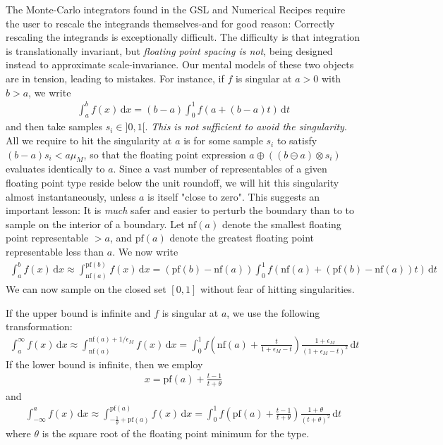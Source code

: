 \documentclass{ansarticle}
\begin{document}
The Monte-Carlo integrators found in the GSL and Numerical Recipes require the user to rescale the integrands themselves-and for good reason: Correctly rescaling the integrands is exceptionally difficult.
The difficulty is that integration is translationally invariant, but \emph{floating point spacing is not}, being designed instead to approximate scale-invariance.
Our mental models of these two objects are in tension, leading to mistakes.
For instance, if $f$ is singular at $a > 0$ with $b > a$, we write
\begin{align*}
\int_{a}^{b} f(x) \, \mathrm{d}x = (b-a) \int_{0}^{1} f(a + (b-a)t) \, \mathrm{d}t
\end{align*}
and then take samples $s_{i} \in ]0, 1[$.
\emph{This is not sufficient to avoid the singularity}.
All we require to hit the singularity at $a$ is for some sample $s_i$ to satisfy $(b-a)s_i < a\mu_{M}$, so that the floating point expression $a\oplus((b\ominus a)\otimes s_i)$ evaluates identically to $a$.
Since a vast number of representables of a given floating point type reside below the unit roundoff, we will hit this singularity almost instantaneously, unless $a$ is itself "close to zero".
This suggests an important lesson: It is \emph{much} safer and easier to perturb the boundary than to to sample on the interior of a boundary.
Let $\mathrm{nf}(a)$ denote the smallest floating point representable $> a$, and $\mathrm{pf}(a)$ denote the greatest floating point representable less than $a$.
We now write
\begin{align*}
\int_{a}^{b} f(x) \, \mathrm{d}x \approx \int_{\mathrm{nf}(a)}^{\mathrm{pf}(b)} f(x) \, \mathrm{d}x  = (\mathrm{pf}(b)- \mathrm{nf}(a)) \int_{0}^{1} f(\mathrm{nf}(a) + (\mathrm{pf}(b)-\mathrm{nf}(a))t) \, \mathrm{d}t
\end{align*}
We can now sample on the closed set $[0, 1]$ without fear of hitting singularities.

If the upper bound is infinite and $f$ is singular at $a$, we use the following transformation:
\begin{align*}
\int_{a}^{\infty} f(x) \, \mathrm{d}x \approx \int_{\mathrm{nf}(a)}^{\mathrm{nf}(a) + 1/\epsilon_{M}} f(x) \, \mathrm{d}x = \int_{0}^{1} f\left(\mathrm{nf}(a) + \frac{t}{1+\epsilon_{M} - t}\right) \frac{1+\epsilon_{M}}{(1+\epsilon_{M} -t)^2} \, \mathrm{d}t
\end{align*}
If the lower bound is infinite, then we employ
\begin{align*}
x = \mathrm{pf}(a) + \frac{t-1}{t+\theta}
\end{align*}
and
\begin{align*}
\int_{-\infty}^{a} f(x) \, \mathrm{d}x
\approx
\int_{-\frac{1}{\theta} + \mathrm{pf}(a)}^{ \mathrm{pf}(a)} f(x) \, \mathrm{d}x
=
\int_{0}^{1} f\left( \mathrm{pf}(a)+ \frac{t-1}{t+\theta}\right) \frac{1+\theta}{(t+\theta)^{2}} \, \mathrm{d}t
\end{align*}
where $\theta$ is the square root of the floating point minimum for the type.
\end{document}
